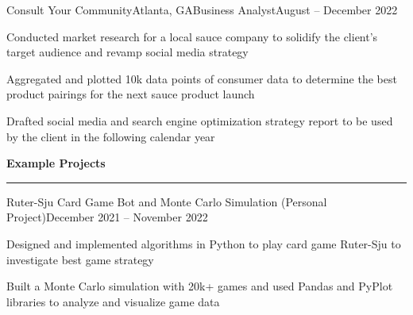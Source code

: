 \documentclass{article}
\newcommand{\horizontal}{\vspace{2pt}\hrule}
\newcommand{\sectitle}[1]{\vspace{2pt} \textbf{\large #1} \horizontal}
\begin{document}
\begin{flushleft}
    \begin{experience}{Consult Your Community}{Atlanta, GA}{Business Analyst}{August -- December 2022}
        \item Conducted market research for a local sauce company to solidify the client's target audience and revamp social media strategy
        \item Aggregated and plotted 10k data points of consumer data to determine the best product pairings for the next sauce product launch
        \item Drafted social media and search engine optimization strategy report to be used by the client in the following calendar year
    \end{experience}

\sectitle{Example Projects}

    \vspace{3pt}


    \begin{subexperience}{Ruter-Sju Card Game Bot and Monte Carlo Simulation (Personal Project)}{December 2021 -- November 2022}
        \item Designed and implemented algorithms in Python to play card game Ruter-Sju to investigate best game strategy
        \item Built a Monte Carlo simulation with 20k+ games and used Pandas and PyPlot libraries to analyze and visualize game data
    \end{subexperience}


\end{flushleft}
\end{document}
